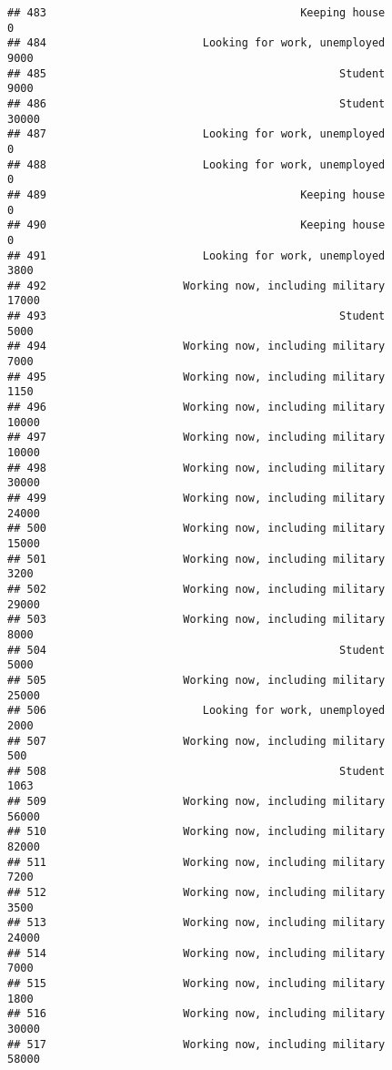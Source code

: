 \documentclass[]{book}
\theoremstyle{definition}
\theoremstyle{definition}
\theoremstyle{remark}
\begin{document}
\begin{verbatim}
## 483                                       Keeping house               0
## 484                        Looking for work, unemployed            9000
## 485                                             Student            9000
## 486                                             Student           30000
## 487                        Looking for work, unemployed               0
## 488                        Looking for work, unemployed               0
## 489                                       Keeping house               0
## 490                                       Keeping house               0
## 491                        Looking for work, unemployed            3800
## 492                     Working now, including military           17000
## 493                                             Student            5000
## 494                     Working now, including military            7000
## 495                     Working now, including military            1150
## 496                     Working now, including military           10000
## 497                     Working now, including military           10000
## 498                     Working now, including military           30000
## 499                     Working now, including military           24000
## 500                     Working now, including military           15000
## 501                     Working now, including military            3200
## 502                     Working now, including military           29000
## 503                     Working now, including military            8000
## 504                                             Student            5000
## 505                     Working now, including military           25000
## 506                        Looking for work, unemployed            2000
## 507                     Working now, including military             500
## 508                                             Student            1063
## 509                     Working now, including military           56000
## 510                     Working now, including military           82000
## 511                     Working now, including military            7200
## 512                     Working now, including military            3500
## 513                     Working now, including military           24000
## 514                     Working now, including military            7000
## 515                     Working now, including military            1800
## 516                     Working now, including military           30000
## 517                     Working now, including military           58000

\end{verbatim}
\end{document}
